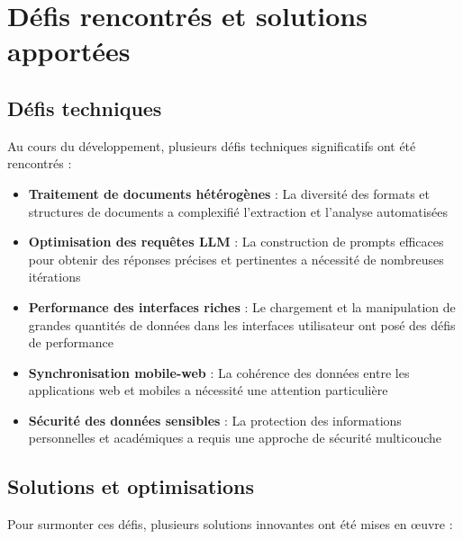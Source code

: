 \section{Défis rencontrés et solutions apportées}

\subsection{Défis techniques}

Au cours du développement, plusieurs défis techniques significatifs ont été rencontrés :

\begin{itemize}
  \item \textbf{Traitement de documents hétérogènes} : La diversité des formats et structures de documents a complexifié l'extraction et l'analyse automatisées
  
  \item \textbf{Optimisation des requêtes LLM} : La construction de prompts efficaces pour obtenir des réponses précises et pertinentes a nécessité de nombreuses itérations
  
  \item \textbf{Performance des interfaces riches} : Le chargement et la manipulation de grandes quantités de données dans les interfaces utilisateur ont posé des défis de performance
  
  \item \textbf{Synchronisation mobile-web} : La cohérence des données entre les applications web et mobiles a nécessité une attention particulière
  
  \item \textbf{Sécurité des données sensibles} : La protection des informations personnelles et académiques a requis une approche de sécurité multicouche
\end{itemize}

\subsection{Solutions et optimisations}

Pour surmonter ces défis, plusieurs solutions innovantes ont été mises en œuvre :

